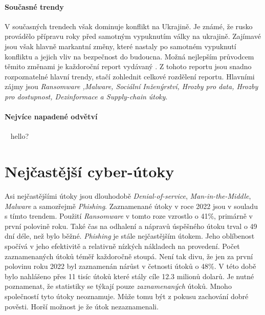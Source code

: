 \paragraph{Současné trendy}
V současných trendech však dominuje konflikt na Ukrajině.
Je známé, že rusko provádělo přípravu roky před samotným vypuknutím války na ukrajině.
Zajímavé jsou však hlavně markantní změny, které nastaly po samotném vypuknutí konfliktu a jejich vliv na bezpečnost do budoucna.
Možná nejlepším průvodcem těmito změnami je každoroční report vydávaný \cite{Enisa_thread_landscape}.
Z tohoto reportu jsou snadno rozpoznatelné hlavní trendy, stačí zohlednit celkové rozdělení reportu.
Hlavními zájmy jsou \textit{Ransomware ,Malware, Sociální Inženýrství, Hrozby pro data,	Hrozby pro dostupnost, Dezinformace a Supply-chain útoky}.
~\label{fig:PrimeThreats}

\paragraph{Nejvíce napadené odvětví}
~\label{fig:TargetedSectors}
hello?
~\label{fig:TargetedSectors}

\section{Nejčastější cyber-útoky}
Asi nejčastějšími útoky jsou dlouhodobě \textit{Denial-of-service}, \textit{Man-in-the-Middle}, \textit{Malware} a samozřejmě \textit{Phishing}\cite{LI20218176}.
Zaznamenané útoky v roce 2022 jsou v souladu s tímto trendem.
Použití \textit{Ransomware} v tomto roze vzrostlo o 41\%, primárně v první polovině roku.
Také čas na odhalení a nápravů úspěšného útoku trval o 49 dní déle, než bylo běžné.
\textit{Phishing} je stále nejčastějším útokem.
Jeho oblíbenost spočívá v jeho efektivitě a relativně nízkých nákladech na provedení.
Počet zaznamenaných útoků téměř každoročně stoupá\cite{moje_bakalarka}.
Není tak divu, že jen za první polovinu roku 2022 byl zaznamenán nárůst v četnosti útoků o 48\%.
V této době bylo nahlášeno přes 11 tisíc útoků které stály cíle 12.3 milionů dolarů.
Je nutné poznamenat, že statistiky se týkají pouze \textit{zaznamenaných} útoků.
Mnoho společností tyto útoky neoznamuje.
Může tomu být z pokusu zachování dobré pověsti.
Horší možnost je že útok nezaznamenali.\cite{securityintelligence_most_common_2022_attacks}

